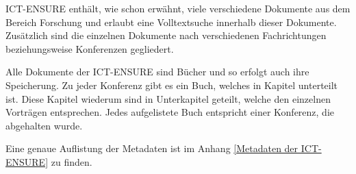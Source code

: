 \ac{ICT-ENSURE} enth\"alt, wie schon erw\"ahnt, viele verschiedene Dokumente aus dem Bereich Forschung und erlaubt eine Volltextsuche innerhalb dieser Dokumente. Zus\"atzlich sind die einzelnen Dokumente nach verschiedenen Fachrichtungen beziehungsweise Konferenzen gegliedert.
\cite{ICT-ENSURE_Bericht}

Alle Dokumente der \ac{ICT-ENSURE} sind B\"ucher und so erfolgt auch ihre Speicherung.
Zu jeder Konferenz gibt es ein Buch, welches in Kapitel unterteilt ist. Diese Kapitel wiederum sind in Unterkapitel geteilt, welche den einzelnen Vortr\"agen entsprechen. Jedes aufgelistete Buch entspricht einer Konferenz, die abgehalten wurde.

Eine genaue Auflistung der Metadaten ist im Anhang \ref{Metadaten der ICT-ENSURE} zu finden.
